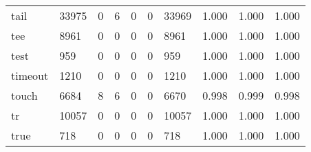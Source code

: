 \begin{longtable}{lp{1.3cm}p{1.3cm}p{1.3cm}p{1.3cm}p{1.3cm}p{1.3cm}p{1.3cm}p{1.3cm}p{1.3cm}}
tail      &                  33975 &                                  0 &                                 6 &                                0 &                                 0 &                           33969 &                                1.000 &                                  1.000 &                                1.000 \\
tee       &                   8961 &                                  0 &                                 0 &                                0 &                                 0 &                            8961 &                                1.000 &                                  1.000 &                                1.000 \\
test      &                    959 &                                  0 &                                 0 &                                0 &                                 0 &                             959 &                                1.000 &                                  1.000 &                                1.000 \\
timeout   &                   1210 &                                  0 &                                 0 &                                0 &                                 0 &                            1210 &                                1.000 &                                  1.000 &                                1.000 \\
touch     &                   6684 &                                  8 &                                 6 &                                0 &                                 0 &                            6670 &                                0.998 &                                  0.999 &                                0.998 \\
tr        &                  10057 &                                  0 &                                 0 &                                0 &                                 0 &                           10057 &                                1.000 &                                  1.000 &                                1.000 \\
true      &                    718 &                                  0 &                                 0 &                                0 &                                 0 &                             718 &                                1.000 &                                  1.000 &                                1.000 \\

\end{longtable}
